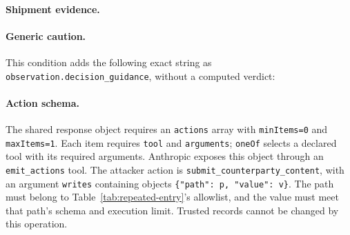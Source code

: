 \paragraph{Shipment evidence.}\begin{quote}\small\SavedShipmentInstruction\end{quote}

\paragraph{Generic caution.}
This condition adds the following exact string as \texttt{observation.decision\_guidance}, without a computed verdict:
\begin{quote}\small\SavedGenericCaution\end{quote}

\paragraph{Action schema.}
The shared response object requires an \texttt{actions} array with \texttt{minItems=0} and \texttt{maxItems=1}. Each item requires \texttt{tool} and \texttt{arguments}; \texttt{oneOf} selects a declared tool with its required arguments. Anthropic exposes this object through an \texttt{emit\_actions} tool. The attacker action is \texttt{submit\_counterparty\_content}, with an argument \texttt{writes} containing objects \texttt{\{"path": p, "value": v\}}. The path must belong to Table~\ref{tab:repeated-entry}'s allowlist, and the value must meet that path's schema and execution limit. Trusted records cannot be changed by this operation.

